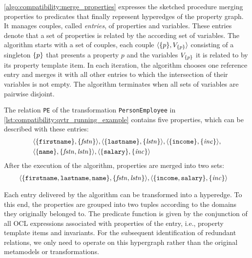 \autoref{algo:compatibility:merge_properties} expresses the sketched procedure merging properties to predicates that finally represent hyperedges of the property graph.
It manages couples, called \emph{entries}, of properties and \qvtr variables.
These entries denote that a set of properties is related by the according set of \qvtr variables.
The algorithm starts with a set of couples, each couple $\langle \{ p \}, V_{\{ p \}} \rangle$ consisting of a singleton $\{ p \}$ that presents a property $p$ and the \qvtr variables $V_{\{ p \}}$ it is related to by its property template item.
In each iteration, the algorithm chooses one reference entry and merges it with all other entries to which the intersection of their \qvtr variables is not empty.
The algorithm terminates when all sets of \qvtr variables are pairwise disjoint.


\begin{example}
The relation \texttt{PE} of the \qvtr transformation \texttt{PersonEmployee} in \autoref{lst:compatibility:qvtr_running_example} contains five properties, which can be described with these entries:
\begin{align*}
&
    \langle \{ \texttt{firstname} \}, \{ \mathit{fstn} \} \rangle, 
    \langle \{ \texttt{lastname} \}, \{ \mathit{lstn} \} \rangle,
    \langle \{ \texttt{income} \}, \{ \mathit{inc} \} \rangle, \\ 
&
    \langle \{ \texttt{name} \}, \{ \mathit{fstn}, \mathit{lstn} \} \rangle,
    \langle \{ \texttt{salary} \}, \{ \mathit{inc} \} \rangle
\end{align*}
After the execution of the algorithm, properties are merged into two sets:
\begin{align*}
&
    \tupled{\setted{\propdisplay{firstname}, \propdisplay{lastname}, \propdisplay{name}}, \setted{\mathvariable{fstn}, \mathvariable{lstn}}}, %
    \tupled{\setted{\propdisplay{income}, \propdisplay{salary}}, \setted{\mathvariable{inc}}}
\end{align*}
\end{example}

Each entry delivered by the algorithm can be transformed into a hyperedge.
To this end, the properties are grouped into two tuples according to the domains they originally belonged to.
The predicate function is given by the conjunction of all \gls{OCL} expressions associated with properties of the entry, i.e., property template items and invariants.
For the subsequent identification of redundant relations, we only need to operate on this hypergraph rather than the original metamodels or \qvtr transformations.

